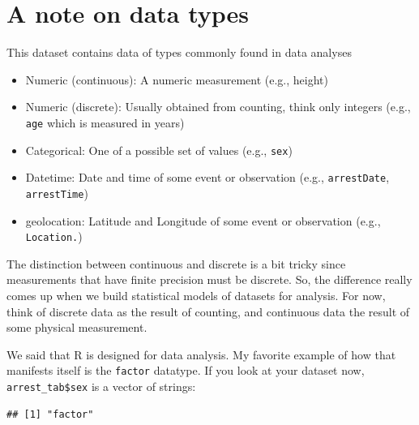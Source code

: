 \documentclass[12pt,]{book}
\newenvironment{Shaded}{\begin{snugshade}}{\end{snugshade}}
\newcommand{\KeywordTok}[1]{\textcolor[rgb]{0.13,0.29,0.53}{\textbf{#1}}}
\newcommand{\OperatorTok}[1]{\textcolor[rgb]{0.81,0.36,0.00}{\textbf{#1}}}
\newcommand{\NormalTok}[1]{#1}
\providecommand{\tightlist}{%
  \setlength{\itemsep}{0pt}\setlength{\parskip}{0pt}}
\theoremstyle{definition}
\theoremstyle{definition}
\theoremstyle{definition}
\theoremstyle{remark}
\begin{document}
\section{A note on data types}\label{a-note-on-data-types}

This dataset contains data of types commonly found in data analyses

\begin{itemize}
\tightlist
\item
  Numeric (continuous): A numeric measurement (e.g., height)\\
\item
  Numeric (discrete): Usually obtained from counting, think only
  integers (e.g., \texttt{age} which is measured in years)\\
\item
  Categorical: One of a possible set of values (e.g., \texttt{sex})\\
\item
  Datetime: Date and time of some event or observation (e.g.,
  \texttt{arrestDate}, \texttt{arrestTime})\\
\item
  geolocation: Latitude and Longitude of some event or observation
  (e.g., \texttt{Location.})
\end{itemize}

The distinction between continuous and discrete is a bit tricky since
measurements that have finite precision must be discrete. So, the
difference really comes up when we build statistical models of datasets
for analysis. For now, think of discrete data as the result of counting,
and continuous data the result of some physical measurement.

We said that R is designed for data analysis. My favorite example of how
that manifests itself is the \texttt{factor} datatype. If you look at
your dataset now, \texttt{arrest\_tab\$sex} is a vector of strings:

\begin{Shaded}
\end{Shaded}

\begin{verbatim}
## [1] "factor"
\end{verbatim}

\begin{Shaded}
\end{Shaded}
\end{document}
